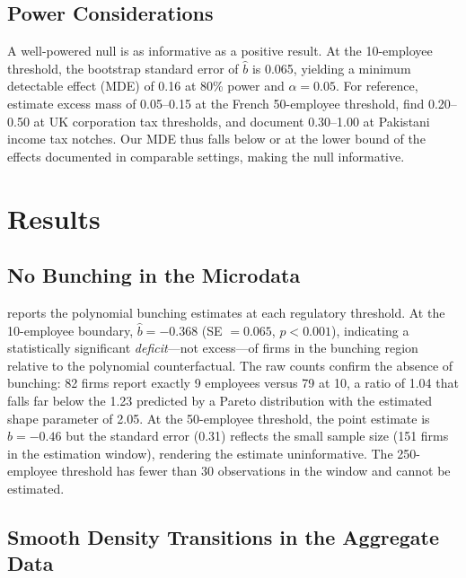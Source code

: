 \documentclass[12pt]{article}
\begin{document}
\subsection{Power Considerations}

A well-powered null is as informative as a positive result. At the 10-employee threshold, the bootstrap standard error of $\hat{b}$ is 0.065, yielding a minimum detectable effect (MDE) of 0.16 at 80\% power and $\alpha = 0.05$. For reference, \citet{garicano2016} estimate excess mass of 0.05--0.15 at the French 50-employee threshold, \citet{devereux2014} find 0.20--0.50 at UK corporation tax thresholds, and \citet{kleven2013} document 0.30--1.00 at Pakistani income tax notches. Our MDE thus falls below or at the lower bound of the effects documented in comparable settings, making the null informative.


\section{Results}

\subsection{No Bunching in the Microdata}

 reports the polynomial bunching estimates at each regulatory threshold. At the 10-employee boundary, $\hat{b} = -0.368$ (SE $= 0.065$, $p < 0.001$), indicating a statistically significant \textit{deficit}---not excess---of firms in the bunching region relative to the polynomial counterfactual. The raw counts confirm the absence of bunching: 82 firms report exactly 9 employees versus 79 at 10, a ratio of 1.04 that falls far below the 1.23 predicted by a Pareto distribution with the estimated shape parameter of 2.05. At the 50-employee threshold, the point estimate is $\hat{b} = -0.46$ but the standard error (0.31) reflects the small sample size (151 firms in the estimation window), rendering the estimate uninformative. The 250-employee threshold has fewer than 30 observations in the window and cannot be estimated.



\subsection{Smooth Density Transitions in the Aggregate Data}
\end{document}
